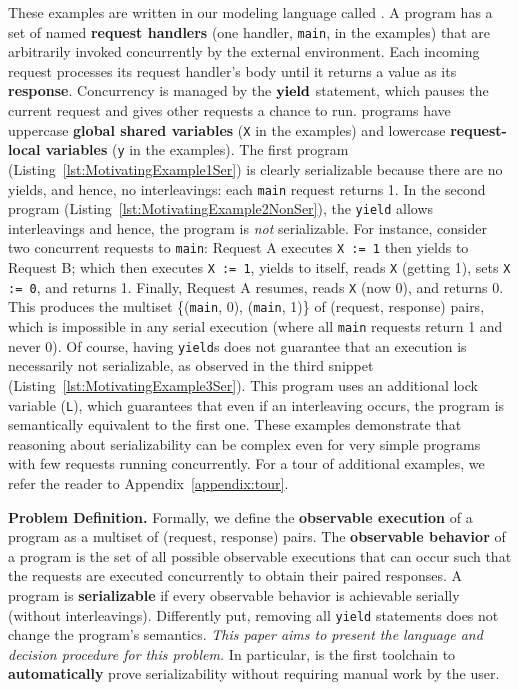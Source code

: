 These examples are written in our modeling language called \toolname.
A \toolname{} program has a set of named \textbf{request handlers} (one handler, \texttt{main}, in the examples) that are arbitrarily invoked concurrently by the external environment.
Each incoming request processes its request handler's body until it returns a value as its \textbf{response}. Concurrency is managed by the \(\textbf{yield}\)
 statement, which pauses the current request and gives other requests a chance to run. \toolname{} programs have uppercase \textbf{global shared variables} (\texttt{X} in the examples) and lowercase \textbf{request-local variables} (\texttt{y} in the examples).
%
%
%
The first program (Listing~\ref{lst:MotivatingExample1Ser}) is clearly serializable because there are no yields, and hence, no interleavings: each \texttt{main} request returns 1.
In the second program (Listing~\ref{lst:MotivatingExample2NonSer}), the \texttt{yield} allows interleavings and hence, the program is \emph{not} serializable. For instance, consider two concurrent requests to \texttt{main}:
Request A executes \texttt{X := 1} then yields to Request B; which then
executes \texttt{X := 1}, yields to itself, reads \texttt{X} (getting 1), sets \texttt{X := 0}, and returns 1.
Finally, 
Request A resumes, reads \texttt{X} (now 0), and returns 0.
This produces the multiset \{(\texttt{main}, 0), (\texttt{main}, 1)\} of (request, response) pairs, which is impossible in any serial execution (where all \texttt{main} requests return 1 and never 0).
Of course, having \texttt{yield}s does not guarantee that an execution is necessarily not serializable, as observed in the third snippet (Listing~\ref{lst:MotivatingExample3Ser}). This program uses an additional lock variable (\texttt{L}), which guarantees that even if an interleaving occurs, the program is semantically equivalent to the first one.
%
These examples demonstrate that reasoning about serializability can be complex even for very simple programs with few requests running concurrently.
%
For a tour of additional examples, we refer the reader to Appendix~\ref{appendix:tour}.

\smallskip
\noindent
\textbf{Problem Definition.}
Formally, we define the \textbf{observable execution} of a \toolname{} program as a multiset of (request, response) pairs. The \textbf{observable behavior} of a \toolname{} program is the set of all possible observable executions that can occur such that the requests are executed concurrently to obtain their paired responses.
A \toolname{} program is \textbf{serializable} if every observable behavior is achievable serially (without interleavings). Differently put, removing all \texttt{yield} statements does not change the program's semantics.
%
\emph{This paper aims to present the \toolname{} language and decision procedure for this problem.} In particular, \toolname{} is the first toolchain to \textbf{automatically} prove serializability without requiring manual work by the user.

